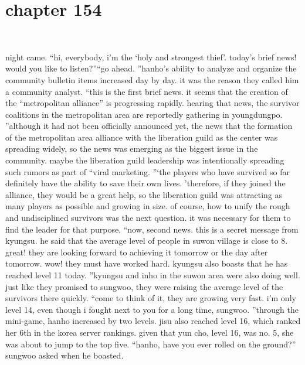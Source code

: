 \section{chapter 154}

                             




night came.
“hi, everybody, i’m the ‘holy and strongest thief’.
 today’s brief news! would you like to listen?”“go ahead.
”hanho’s ability to analyze and organize the community bulletin items increased day by day.
it was the reason they called him a community analyst.
“this is the first brief news.
 it seems that the creation of the “metropolitan alliance” is progressing rapidly.
 hearing that news, the survivor coalitions in the metropolitan area are reportedly gathering in youngdungpo.
”although it had not been officially announced yet, the news that the formation of the metropolitan area alliance with the liberation guild as the center was spreading widely, so the news was emerging as the biggest issue in the community.
maybe the liberation guild leadership was intentionally spreading such rumors as part of “viral marketing.
”‘the players who have survived so far definitely have the ability to save their own lives.
’therefore, if they joined the alliance, they would be a great help, so the liberation guild was attracting as many players as possible and growing in size.
of course, how to unify the rough and undisciplined survivors was the next question.
it was necessary for them to find the leader for that purpose.
“now, second news.
 this is a secret message from kyungsu.
 he said that the average level of people in suwon village is close to 8.
 great! they are looking forward to achieving it tomorrow or the day after tomorrow.
 wow! they must have worked hard.
 kyungsu also boasts that he has reached level 11 today.
”kyungsu and inho in the suwon area were also doing well.
 just like they promised to sungwoo, they were raising the average level of the survivors there quickly.
“come to think of it, they are growing very fast.
 i’m only level 14, even though i fought next to you for a long time, sungwoo.
”through the mini-game, hanho increased by two levels.
 jisu also reached level 16, which ranked her 6th in the korea server rankings.
 given that yun cho, level 16, was no.
 5, she was about to jump to the top five.
“hanho, have you ever rolled on the ground?” sungwoo asked when he boasted.

